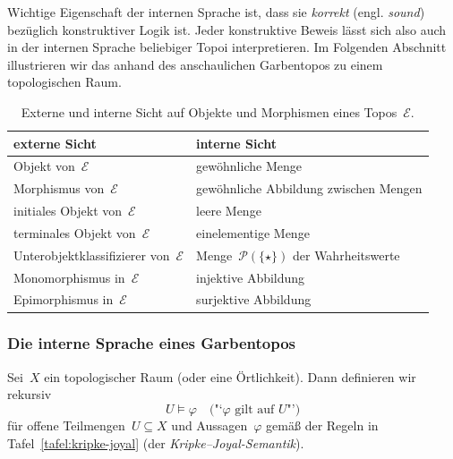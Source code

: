\documentclass[a4paper,ngerman,12pt]{scrartcl}
\theoremstyle{definition}
\theoremstyle{plain}
\theoremstyle{remark}
\newcommand{\E}{\mathcal{E}}
\renewcommand{\P}{\mathcal{P}}
\renewcommand{\_}{\mathpunct{.}\,}
\newcommand{\?}{\,{:}\,}
\begin{document}
Wichtige Eigenschaft der internen Sprache ist, dass sie \emph{korrekt} (engl.
\emph{sound}) bezüglich konstruktiver Logik ist. Jeder konstruktive Beweis
lässt sich also auch in der internen Sprache beliebiger Topoi interpretieren.
Im Folgenden Abschnitt illustrieren wir das anhand des anschaulichen
Garbentopos zu einem topologischen Raum.

\begin{table}
  \centering
  \small
  \begin{tabular}{@{}ll@{}}
    \toprule
    externe Sicht & interne Sicht
    \\\midrule
    Objekt von~$\E$ & gewöhnliche Menge \\
    Morphismus von~$\E$ & gewöhnliche Abbildung zwischen Mengen \\
    initiales Objekt von~$\E$ & leere Menge \\
    terminales Objekt von~$\E$ & einelementige Menge \\
    Unterobjektklassifizierer von~$\E$ & Menge~$\P(\{\star\})$ der
    Wahrheitswerte \\
    Monomorphismus in~$\E$ & injektive Abbildung \\
    Epimorphismus in~$\E$ & surjektive Abbildung \\
    \bottomrule
  \end{tabular}
  \caption{\label{tafel:externintern}Externe und interne Sicht auf Objekte und
  Morphismen eines Topos~$\E$.}
\end{table}


\subsubsection*{Die interne Sprache eines Garbentopos}

\label{internesprache}%
Sei~$X$ ein topologischer Raum (oder eine Örtlichkeit). Dann definieren wir rekursiv
\[ U \models \varphi \quad \text{("`$\varphi$ gilt auf~$U$"')} \]
für offene Teilmengen~$U \subseteq X$ und Aussagen~$\varphi$ gemäß
der Regeln in Tafel~\ref{tafel:kripke-joyal} (der
\emph{Kripke--Joyal-Semantik}).
\end{document}
